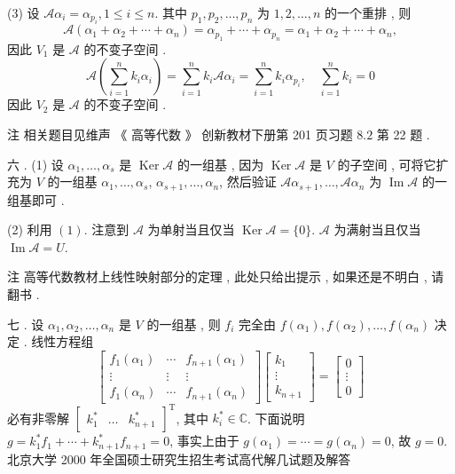 \documentclass[10pt]{article}
\begin{document}
(3)  设  $\mathscr{A} \alpha_{i}=\alpha_{p_{i}}, 1 \leqslant i \leqslant n$.  其中  $p_{1}, p_{2}, \ldots, p_{n}$  为  $1,2, \ldots, n$  的一个重排 ,  则 
$$
\mathscr{A}\left(\alpha_{1}+\alpha_{2}+\cdots+\alpha_{n}\right)=\alpha_{p_{1}}+\cdots+\alpha_{p_{n}}=\alpha_{1}+\alpha_{2}+\cdots+\alpha_{n},
$$
 因此  $V_{1}$  是  $\mathscr{A}$  的不变子空间 .
$$
\mathscr{A}\left(\sum_{i=1}^{n} k_{i} \alpha_{i}\right)=\sum_{i=1}^{n} k_{i} \mathscr{A} \alpha_{i}=\sum_{i=1}^{n} k_{i} \alpha_{p_{i}}, \quad \sum_{i=1}^{n} k_{i}=0
$$
 因此  $V_{2}$  是  $\mathscr{A}$  的不变子空间 .

 注   相关题目见维声  《 高等代数 》 创新教材下册第  201  页习题  $8.2$  第  22  题 .

 六 . (1)  设  $\alpha_{1}, \ldots, \alpha_{s}$  是  $\operatorname{Ker} \mathscr{A}$  的一组基 ,  因为  $\operatorname{Ker} \mathscr{A}$  是  $V$  的子空间 ,  可将它扩充为  $V$  的一组基  $\alpha_{1}, \ldots, \alpha_{s}$, $\alpha_{s+1}, \ldots, \alpha_{n}$,  然后验证  $\mathscr{A} \alpha_{s+1}, \ldots, \mathscr{A} \alpha_{n}$  为  $\operatorname{Im} \mathscr{A}$  的一组基即可 .

(2)  利用  $(1)$.  注意到  $\mathscr{A}$  为单射当且仅当  $\operatorname{Ker} \mathscr{A}=\{0\}$. $\mathscr{A}$  为满射当且仅当  $\operatorname{Im} \mathscr{A}=U$.

 注   高等代数教材上线性映射部分的定理 ,  此处只给出提示 ,  如果还是不明白 ,  请翻书 .

 七 .  设  $\alpha_{1}, \alpha_{2}, \ldots, \alpha_{n}$  是  $V$  的一组基 ,  则  $f_{i}$  完全由  $f\left(\alpha_{1}\right), f\left(\alpha_{2}\right), \ldots, f\left(\alpha_{n}\right)$  决定 .  线性方程组 
$$
\left[\begin{array}{ccc}
f_{1}\left(\alpha_{1}\right) & \cdots & f_{n+1}\left(\alpha_{1}\right) \\
\vdots & \vdots & \vdots \\
f_{1}\left(\alpha_{n}\right) & \cdots & f_{n+1}\left(\alpha_{n}\right)
\end{array}\right]\left[\begin{array}{c}
k_{1} \\
\vdots \\
k_{n+1}
\end{array}\right]=\left[\begin{array}{c}
0 \\
\vdots \\
0
\end{array}\right]
$$
 必有非零解  $\left[\begin{array}{lll}k_{1}^{*} & \ldots & k_{n+1}^{*}\end{array}\right]^{\mathrm{T}}$,  其中  $k_{i}^{*} \in \mathbb{C}$.  下面说明  $g=k_{1}^{*} f_{1}+\cdots+k_{n+1}^{*} f_{n+1}=0$,  事实上由于  $g\left(\alpha_{1}\right)=\cdots=g\left(\alpha_{n}\right)=0$,  故  $g=0$.  北京大学  2000  年全国硕士研究生招生考试高代解几试题及解答 
\end{document}
